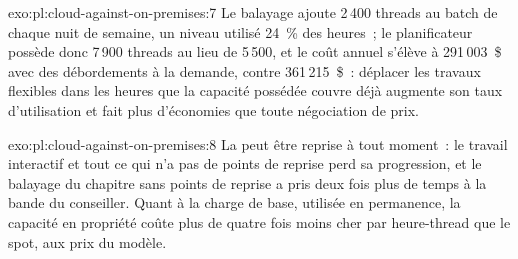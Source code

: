 \begin{solution}{exo:pl:cloud-against-on-premises:7}
Le balayage ajoute 2\,400 threads au batch de chaque nuit de semaine, un niveau utilisé 24~\% des heures~; le planificateur possède donc 7\,900 threads au lieu de 5\,500, et le coût
annuel s'élève à 291\,003~\$ avec des débordements à la demande, contre 361\,215~\$~: déplacer les travaux flexibles dans les heures que la capacité possédée couvre déjà augmente son taux d'utilisation
et fait plus d'économies que toute négociation de prix.
\end{solution}

\begin{solution}{exo:pl:cloud-against-on-premises:8}
La  peut être reprise à tout moment~: le travail interactif et tout ce qui n'a pas de points de reprise perd sa progression, et le balayage du chapitre
sans points de reprise a pris deux fois plus de temps à la bande du conseiller. Quant à la charge de base, utilisée en permanence, la capacité en propriété coûte plus de quatre fois moins cher par
heure-thread que le spot, aux prix du modèle.
\end{solution}

